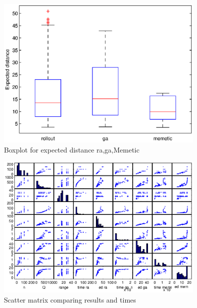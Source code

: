 \begin{figure}[!htbp]
  \begin{center}
   \includegraphics[width=0.9\textwidth]{Images/Chapter5/comparative_results_box.eps}
  \end{center}
    \caption{Boxplot for expected distance ra,ga,Memetic}\label{fig:comparative_results_box}
\end{figure}

\begin{figure}[!htbp]
  \begin{center}
   \includegraphics[width=0.9\textwidth]{Images/Chapter5/comparative_results_matrix.eps}
  \end{center}
    \caption{Scatter matrix comparing results and times}\label{fig:comparative_results_matrix}
\end{figure}


